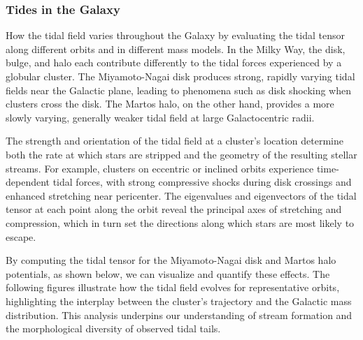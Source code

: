         \subsubsection*{Tides in the Galaxy}
            
            How the tidal field varies throughout the Galaxy by evaluating the tidal tensor along different orbits and in different mass models. In the Milky Way, the disk, bulge, and halo each contribute differently to the tidal forces experienced by a globular cluster. The Miyamoto-Nagai disk produces strong, rapidly varying tidal fields near the Galactic plane, leading to phenomena such as disk shocking when clusters cross the disk. The Martos halo, on the other hand, provides a more slowly varying, generally weaker tidal field at large Galactocentric radii.

            The strength and orientation of the tidal field at a cluster's location determine both the rate at which stars are stripped and the geometry of the resulting stellar streams. For example, clusters on eccentric or inclined orbits experience time-dependent tidal forces, with strong compressive shocks during disk crossings and enhanced stretching near pericenter. The eigenvalues and eigenvectors of the tidal tensor at each point along the orbit reveal the principal axes of stretching and compression, which in turn set the directions along which stars are most likely to escape.

            By computing the tidal tensor for the Miyamoto-Nagai disk and Martos halo potentials, as shown below, we can visualize and quantify these effects. The following figures illustrate how the tidal field evolves for representative orbits, highlighting the interplay between the cluster's trajectory and the Galactic mass distribution. This analysis underpins our understanding of stream formation and the morphological diversity of observed tidal tails.

